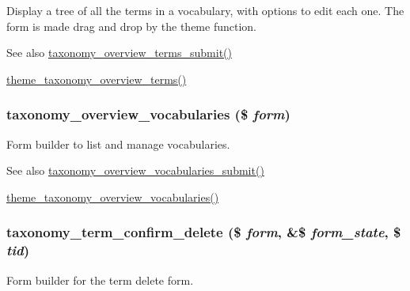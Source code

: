 Display a tree of all the terms in a vocabulary, with options to edit each one. The form is made drag and drop by the theme function.

\begin{DoxySeeAlso}{See also}
\hyperlink{taxonomy_8admin_8inc_afb672457712a0a215cdeaa91748b4517}{taxonomy\_\-overview\_\-terms\_\-submit()} 

\hyperlink{group__themeable_gabcead84347c45b0e1316953ab53bf3ad}{theme\_\-taxonomy\_\-overview\_\-terms()} 
\end{DoxySeeAlso}
\hypertarget{group__forms_ga4509184b09d51fc6f3cccbd883cbd4f8}{
\subsubsection[{taxonomy\_\-overview\_\-vocabularies}]{\setlength{\rightskip}{0pt plus 5cm}taxonomy\_\-overview\_\-vocabularies (\$ {\em form})}}
\label{group__forms_ga4509184b09d51fc6f3cccbd883cbd4f8}
Form builder to list and manage vocabularies.

\begin{DoxySeeAlso}{See also}
\hyperlink{taxonomy_8admin_8inc_a2c0c58c11c7f85fa38bab165004f98e2}{taxonomy\_\-overview\_\-vocabularies\_\-submit()} 

\hyperlink{group__themeable_ga8037235a6d606e3f579783845327fdc0}{theme\_\-taxonomy\_\-overview\_\-vocabularies()} 
\end{DoxySeeAlso}
\hypertarget{group__forms_gabdfecf623fb2fe428cb6401de1375662}{
\subsubsection[{taxonomy\_\-term\_\-confirm\_\-delete}]{\setlength{\rightskip}{0pt plus 5cm}taxonomy\_\-term\_\-confirm\_\-delete (\$ {\em form}, \/  \&\$ {\em form\_\-state}, \/  \$ {\em tid})}}
\label{group__forms_gabdfecf623fb2fe428cb6401de1375662}
Form builder for the term delete form.

